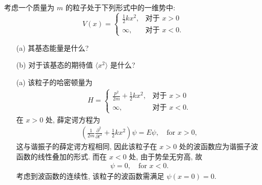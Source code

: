 \documentclass{assignment}
\begin{document}
\begin{prob}[课本习题 2.22]
    考虑一个质量为 $m$ 的粒子处于下列形式中的一维势中:
    \[
        V(x)=\left\{\begin{array}{ll}
            \frac{1}{2}kx^2,&\text{对于 }x>0\\
            \infty,&\text{对于 }x<0.
        \end{array}\right.
    \]
    \begin{itemize}
        \item[(a)] 其基态能量是什么?
        \item[(b)] 对于该基态的期待值 $\langle x^2\rangle$ 是什么?
    \end{itemize}
\end{prob}
\begin{sol}
    \begin{itemize}
        \item[(a)] 该粒子的哈密顿量为
        \begin{align}
            H=\left\{\begin{array}{ll}
                \frac{p^2}{2m}+\frac{1}{2}kx^2,&\text{对于 }x>0\\
                \infty,&\text{对于 }x<0.
            \end{array}\right.
        \end{align}
        在 $x>0$ 处, 薛定谔方程为
        \begin{align}
            \left(\frac{1}{2m}\frac{\partial^2}{\partial t^2}+\frac{1}{2}kx^2\right)\psi=E\psi,\quad\text{for }x>0,
        \end{align}
        这与谐振子的薛定谔方程相同, 因此该粒子在 $x>0$ 处的波函数应为谐振子波函数的线性叠加的形式.
        而在 $x<0$ 处, 由于势垒无穷高, 故
        \begin{align}
            \psi=0,\quad\text{for }x<0.
        \end{align}
        考虑到波函数的连续性, 该粒子的波函数需满足 $\psi(x=0)=0$.


\end{itemize}
\end{sol}
\end{document}
